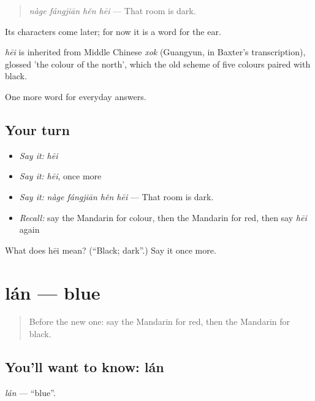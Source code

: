 \begin{quote}
\emph{nàge fángjiān hěn hēi} — That room is dark.
\end{quote}

Its characters come later; for now it is a word for the ear.

\begin{cousinweb}
\emph{hēi} is inherited from Middle Chinese \emph{xok} (Guangyun, in Baxter's transcription), glossed 'the colour of the north', which the old scheme of five colours paired with black.
\end{cousinweb}

\begin{grammarlens}[title={What you've built}]
One more word for everyday answers.
\end{grammarlens}

\subsection*{Your turn}
\begin{itemize}
\raggedright
  \item \emph{Say it:} \emph{hēi}
  \item \emph{Say it:} \emph{hēi}, once more
  \item \emph{Say it:} \emph{nàge fángjiān hěn hēi} — That room is dark.
  \item \emph{Recall:} say the Mandarin for colour, then the Mandarin for red, then say \emph{hēi} again
\end{itemize}

\begin{tcolorbox}[breakable,colback=teal!4,colframe=teal!35!black,title={Before you move on}]
What does hēi mean? (\textquotedblleft{}Black; dark\textquotedblright{}.) Say it once more.
\end{tcolorbox}
\section[lán]{lán — blue}

\label{lesson:ZH-C60-lan}



\begin{quote}
Before the new one: say the Mandarin for red, then the Mandarin for black.
\end{quote}

\subsection*{You'll want to know: lán}
\emph{lán} — \textquotedblleft{}blue\textquotedblright{}.


